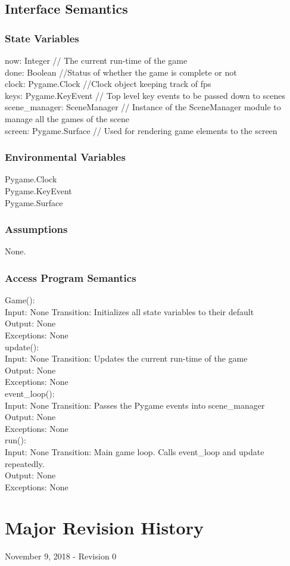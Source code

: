 \documentclass[12pt, titlepage]{article}
\begin{document}
\subsection{Interface Semantics}
\subsubsection{State Variables}
now: Integer // The current run-time of the game \\
done: Boolean //Status of whether the game is complete or not \\
clock: Pygame.Clock //Clock object keeping track of fps \\
keys: Pygame.KeyEvent // Top level key events to be passed down to scenes\\
scene\_manager: SceneManager // Instance of the SceneManager module to manage all the games of the scene \\
screen: Pygame.Surface // Used for rendering game elements to the screen \\
\subsubsection{Environmental Variables}
Pygame.Clock \\
Pygame.KeyEvent \\
Pygame.Surface \\
\subsubsection{Assumptions}
None.
\subsubsection{Access Program Semantics}

Game(): \\
Input: None
Transition: Initializes all state variables to their default \\
Output: None \\
Exceptions: None \\

update(): \\
Input: None
Transition:  Updates the current run-time of the game\\
Output: None \\
Exceptions: None \\

event\_loop(): \\
Input: None
Transition:  Passes the Pygame events into scene\_manager \\
Output: None \\
Exceptions: None \\

run(): \\
Input: None
Transition:  Main game loop. Calls event\_loop and update repeatedly. \\
Output: None \\
Exceptions: None \\


\section{Major Revision History}
November 9, 2018 - Revision 0
\end{document}

